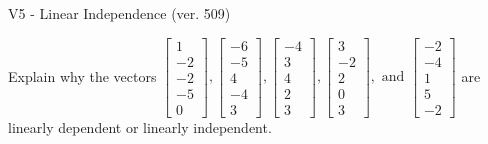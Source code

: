 \begin{exercise}
  \begin{exerciseTitle}V5 - Linear Independence (ver. 509)\end{exerciseTitle}
  \begin{exerciseStatement}
    Explain why the vectors \(\left[\begin{array}{r}
1 \\
-2 \\
-2 \\
-5 \\
0
\end{array}\right] , \left[\begin{array}{r}
-6 \\
-5 \\
4 \\
-4 \\
3
\end{array}\right] , \left[\begin{array}{r}
-4 \\
3 \\
4 \\
2 \\
3
\end{array}\right] , \left[\begin{array}{r}
3 \\
-2 \\
2 \\
0 \\
3
\end{array}\right] , \text{ and } \left[\begin{array}{r}
-2 \\
-4 \\
1 \\
5 \\
-2
\end{array}\right]\) are linearly dependent or linearly independent.	



\end{exerciseStatement}
\end{exercise}
